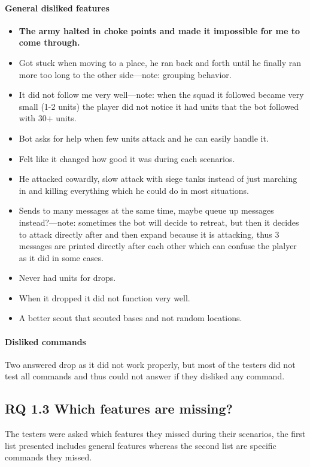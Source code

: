 \paragraph{General disliked features}
\begin{itemize}
	\item \textbf{The army halted in choke points and made it impossible for me to come through.}
	\item Got stuck when moving to a place, he ran back and forth until he finally ran more too long to the other side—note: grouping behavior.
	\item It did not follow me very well—note: when the squad it followed became very small (1-2 units) the player did not notice it had units that the bot followed with 30+ units.
	\item Bot asks for help when few units attack and he can easily handle it.
	\item Felt like it changed how good it was during each scenarios.
	\item He attacked cowardly, slow attack with siege tanks instead of just marching in and killing everything which he could do in most situations.
	\item Sends to many messages at the same time, maybe queue up messages instead?—note: sometimes the bot will decide to retreat, but then it decides to attack directly after and then expand because it is attacking, thus 3 messages are printed directly after each other which can confuse the plalyer as it did in some cases.
	\item Never had units for drops.
	\item When it dropped it did not function very well.
	\item A better scout that scouted bases and not random locations.
\end{itemize}

\paragraph{Disliked commands}Two answered drop as it did not work properly, but most of the testers did not test all commands and thus could not answer if they disliked any command.

\subsection{RQ 1.3 Which features are missing?}
The testers were asked which features they missed during their scenarios, the first list presented includes general features whereas the second list are specific commands they missed.
